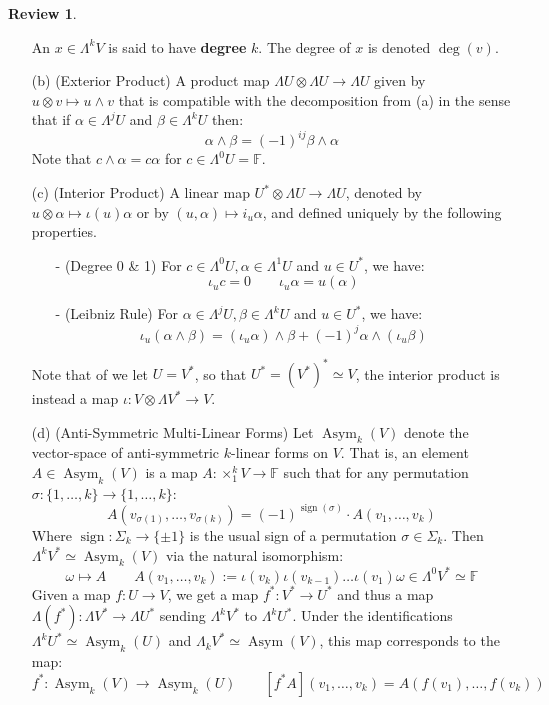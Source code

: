 \documentclass[12pt]{article}
\theoremstyle{definition}
\newtheorem{review}[theorem]{Review}
\numberwithin{equation}{section}
\newcommand{\op}{\operatorname}
\begin{document}
\begin{review}
\begin{itemize}
	An $x \in \Lambda^k V$ is said to have {\bf degree} $k$. The degree of $x$ is denoted $\op{deg}(v)$.
 	\item[(b)] (Exterior Product) A product map $\Lambda U \otimes \Lambda U \to \Lambda U$ given by $u \otimes v \mapsto u \wedge v$ that is compatible with the decomposition from (a) in the sense that if $\alpha \in \Lambda^j U$ and $\beta \in \Lambda^k U$ then:
	\[
	\alpha \wedge \beta = (-1)^{ij} \beta \wedge \alpha
	\]
	Note that $c \wedge \alpha = c\alpha$ for $c \in \Lambda^0 U = \mathbb{F}$.
	\item[(c)] (Interior Product) A linear map $U^* \otimes \Lambda  U \to \Lambda U$, denoted by $u \otimes \alpha \mapsto \iota(u) \alpha$ or by $(u,\alpha) \mapsto i_u \alpha$, and defined uniquely by the following properties.
	\begin{itemize}
		\item[-] (Degree 0 \& 1) For $c \in \Lambda^0 U, \alpha \in \Lambda^1 U$ and $u \in U^*$, we have:
		\[\iota_u c = 0 \qquad \iota_u \alpha = u(\alpha)\]
		\item[-] (Leibniz Rule) For $\alpha \in \Lambda^j U, \beta \in \Lambda^k U$ and $u \in U^*$, we have:
		\[\iota_u(\alpha \wedge \beta) = (\iota_u \alpha) \wedge \beta + (-1)^j \alpha \wedge (\iota_u \beta)\]
	\end{itemize} 
	Note that of we let $U = V^*$, so that $U^* = (V^*)^* \simeq V$, the interior product is instead a map $\iota:V \otimes \Lambda V^* \to V$. 
	\item[(d)] (Anti-Symmetric Multi-Linear Forms) Let $\op{Asym}_k(V)$ denote the vector-space of anti-symmetric $k$-linear forms on $V$. That is, an element $A \in \op{Asym}_k(V)$ is a map $A:\times_1^k V \to \mathbb{F}$ such that for any permutation $\sigma:\{1,\dots,k\} \to \{1,\dots,k\}$:
	\[
	A(v_{\sigma(1)},\dots,v_{\sigma(k)}) = (-1)^{\op{sign}(\sigma)} \cdot A(v_1,\dots,v_k)
	\]
	Where $\op{sign}:\Sigma_k \to \{\pm 1\}$ is the usual sign of a permutation $\sigma \in \Sigma_k$. Then $\Lambda^k V^* \simeq \op{Asym}_k(V)$ via the natural isomorphism:
	\[
	\omega \mapsto A \qquad A(v_1,\dots,v_k) := \iota(v_k)\iota(v_{k-1})\dots \iota(v_1)\omega \in \Lambda^0V^* \simeq \mathbb{F}
	\]
	Given a map $f:U \to V$, we get a map $f^*:V^* \to U^*$ and thus a map $\Lambda(f^*):\Lambda V^* \to \Lambda U^*$ sending $\Lambda^kV^*$ to $\Lambda^k U^*$. Under the identifications $\Lambda^k U^* \simeq \op{Asym}_k(U)$ and $\Lambda_k V^* \simeq \op{Asym}(V)$, this map corresponds to the map:
	\[
	f^*:\op{Asym}_k(V) \to \op{Asym}_k(U) \qquad [f^*A](v_1,\dots,v_k) = A(f(v_1),\dots,f(v_k))
	\]
\end{itemize}


\end{review}
\end{document}
